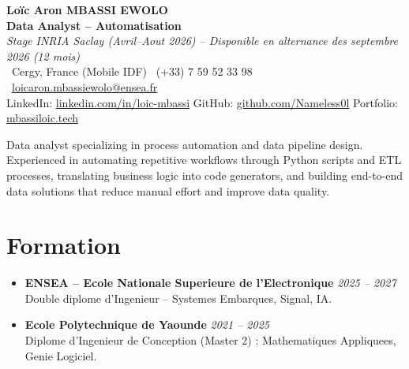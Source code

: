 \documentclass[a4paper,11pt]{article}
\begin{document}
\begin{center}
    {\Large \textbf{Lo\"ic Aron MBASSI EWOLO}} \\ \vspace{4pt}
    \textbf{\large Data Analyst -- Automatisation} \\
    \textit{\small Stage INRIA Saclay (Avril--Aout 2026) -- Disponible en alternance des septembre 2026 (12 mois)} \\ \vspace{4pt}
    \small
    \Pointinghand\ Cergy, France (Mobile IDF) \quad
    \Mobilefone\ (+33) 7 59 52 33 98 \quad
    {\color{primary}\Letter\ \href{mailto:loicaron.mbassiewolo@ensea.fr}{loicaron.mbassiewolo@ensea.fr}} \\ \vspace{2pt}
    {\color{primary}LinkedIn: \href{https://www.linkedin.com/in/loic-mbassi/}{linkedin.com/in/loic-mbassi}} \quad
    {\color{primary}GitHub: \href{https://github.com/Nameless0l}{github.com/Nameless0l}} \quad
    {\color{primary}Portfolio: \href{https://mbassiloic.tech}{mbassiloic.tech}}
\end{center}

\vspace{-6pt}

\noindent\small{Data analyst specializing in process automation and data pipeline design. Experienced in automating repetitive workflows through Python scripts and ETL processes, translating business logic into code generators, and building end-to-end data solutions that reduce manual effort and improve data quality.}

\section{Formation}
\begin{itemize}[leftmargin=*, label=\tiny$\bullet$, nosep]
    \item \textbf{ENSEA -- Ecole Nationale Superieure de l'Electronique} \hfill \textit{2025 -- 2027} \\
    \small{Double diplome d'Ingenieur -- Systemes Embarques, Signal, IA.}
    \item \textbf{Ecole Polytechnique de Yaounde} \hfill \textit{2021 -- 2025} \\
    \small{Diplome d'Ingenieur de Conception (Master 2) : Mathematiques Appliquees, Genie Logiciel.}
\end{itemize}
\end{document}
